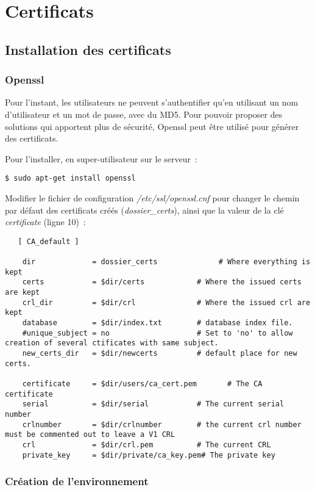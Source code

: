 \section{Certificats}
\subsection{Installation des certificats}
\subsubsection{Openssl}

Pour l'instant, les utilisateurs ne peuvent s'authentifier qu'en utilisant un nom d'utilisateur et un mot de passe, avec du MD5. Pour pouvoir proposer des solutions qui apportent plus de sécurité, Openssl peut être utilisé pour générer des certificats.

Pour l'installer, en super-utilisateur sur le serveur~:

\begin{lstlisting}
$ sudo apt-get install openssl
\end{lstlisting}

Modifier le fichier de configuration \emph{/etc/ssl/openssl.cnf} pour changer le chemin par défaut des certificats créés (\emph{dossier\_certs}), ainsi que la valeur de la clé \emph{certificate} (ligne 10)~:

\begin{lstlisting}
   [ CA_default ]

    dir             = dossier_certs              # Where everything is kept
    certs           = $dir/certs            # Where the issued certs are kept
    crl_dir         = $dir/crl              # Where the issued crl are kept
    database        = $dir/index.txt        # database index file.
    #unique_subject = no                    # Set to 'no' to allow creation of several ctificates with same subject.
    new_certs_dir   = $dir/newcerts         # default place for new certs.

    certificate     = $dir/users/ca_cert.pem       # The CA certificate
    serial          = $dir/serial           # The current serial number
    crlnumber       = $dir/crlnumber        # the current crl number must be commented out to leave a V1 CRL
    crl             = $dir/crl.pem          # The current CRL
    private_key     = $dir/private/ca_key.pem# The private key
\end{lstlisting}

\subsubsection{Création de l'environnement}

